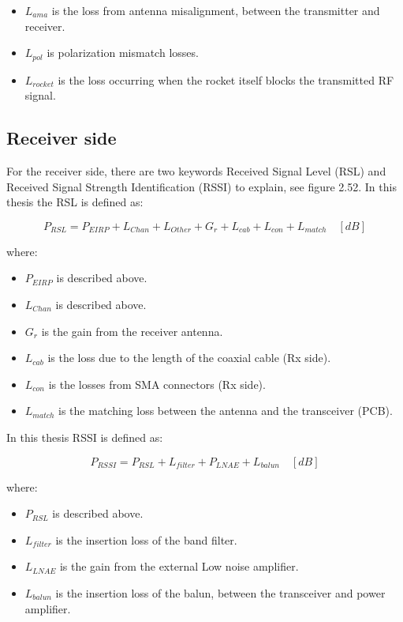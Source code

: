 \begin{itemize}
    \item $L_{ama}$ is the loss from antenna misalignment, between the transmitter and receiver.
    \item $L_{pol}$ is polarization mismatch losses.
    \item $L_{rocket}$ is the loss occurring when the rocket itself blocks the transmitted RF signal. 
\end{itemize}

\subsection{Receiver side}
For the receiver side, there are two keywords Received Signal Level (RSL) and Received Signal Strength Identification (RSSI) to explain, see figure 2.52. In this thesis the RSL is defined as: 

\begin{equation}
   P_{RSL} = P_{EIRP}+L_{Chan}+L_{Other}+G_{r}+L_{cab}+L_{con}+L_{match} \quad [dB]
\end{equation}

where:

\begin{itemize}
    \item $P_{EIRP}$ is described above.
    \item $L_{Chan}$ is described above.
    \item $G_{r}$ is the gain from the receiver antenna.
    \item $L_{cab}$ is the loss due to the length of the coaxial cable (Rx side).
    \item $L_{con}$ is the losses from SMA connectors (Rx side).
    \item $L_{match}$ is the matching loss between the antenna and the transceiver (PCB).
\end{itemize}

In this thesis RSSI is defined as: 

\begin{equation}
   P_{RSSI} = P_{RSL}+L_{filter}+P_{LNAE}+L_{balun} \quad [dB]
\end{equation}

where:

\begin{itemize}
    \item $P_{RSL}$ is described above.
    \item $L_{filter}$ is the insertion loss of the band filter.
    \item $L_{LNAE}$ is the gain from the external Low noise amplifier.
    \item $L_{balun}$ is the insertion loss of the balun, between the transceiver and power amplifier.
\end{itemize}

